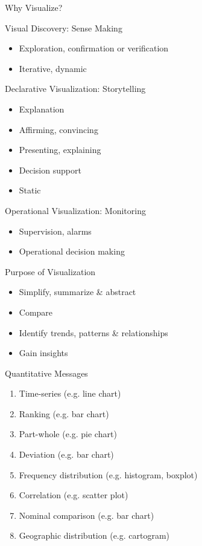 \documentclass[ignorenonframetext,xcolor=x11names]{beamer}
\begin{document}
\begin{frame}{Why Visualize?}
\begin{block}{Visual Discovery: Sense Making}
  \begin{itemize}
  \item \alert{Exploration}, confirmation or verification
  \item Iterative, dynamic
  \end{itemize}
\end{block}

\begin{block}{Declarative Visualization: Storytelling}
  \begin{itemize}
  \item \alert{Explanation}
  \item Affirming, convincing
  \item Presenting, explaining
  \item Decision support
  \item Static
  \end{itemize}
\end{block}

\begin{block}{Operational Visualization: Monitoring}
	\begin{itemize}
		\item Supervision, alarms
		\item Operational decision making
	\end{itemize}
\end{block}
\end{frame}

\begin{frame}{Purpose of Visualization}
\begin{itemize}
  \item Simplify, summarize \& abstract
  \item Compare
  \item Identify trends, patterns \& relationships
  \item Gain insights
\end{itemize}
\end{frame}

\begin{frame}{Quantitative Messages}
\begin{enumerate}
   \item Time-series (e.g. line chart)
   \item Ranking (e.g. bar chart)
   \item Part-whole (e.g. pie chart)
   \item Deviation (e.g. bar chart)
   \item Frequency distribution (e.g. histogram, boxplot)
   \item Correlation (e.g. scatter plot)
   \item Nominal comparison (e.g. bar chart)
   \item Geographic distribution (e.g. cartogram)
\end{enumerate}
\end{frame}
\end{document}
